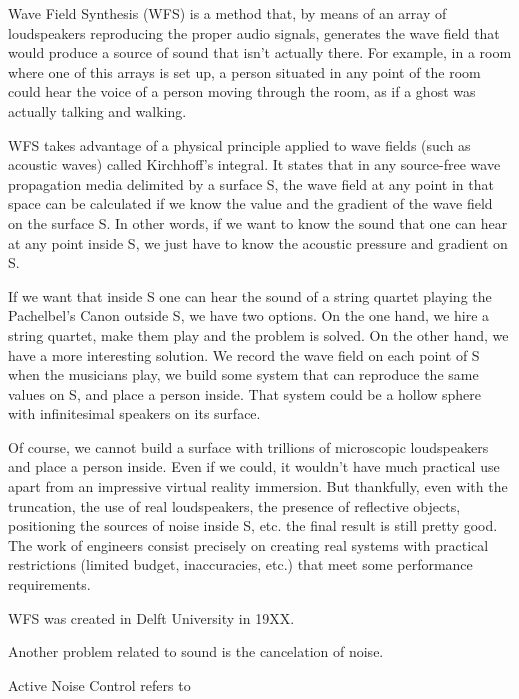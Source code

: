 Wave Field Synthesis (WFS) is a method that, by means of an array of loudspeakers reproducing the proper audio signals, generates the wave field that would produce a source of sound that isn't actually there. For example, in a room where one of this arrays is set up, a person situated in any point of the room could hear the voice of a person moving through the room, as if a ghost was actually talking and walking.

WFS takes advantage of a physical principle applied to wave fields (such as acoustic waves) called Kirchhoff's integral. It states that in any source-free wave propagation media delimited by a surface S, the wave field at any point in that space can be calculated if we know the value and the gradient of the wave field on the surface S. In other words, if we want to know the sound that one can hear at any point inside S, we just have to know the acoustic pressure and gradient on S.

If we want that inside S one can hear the sound of a string quartet playing the Pachelbel's Canon outside S, we have two options. On the one hand, we hire a string quartet, make them play and the problem is solved. On the other hand, we have a more interesting solution. We record the wave field on each point of S when the musicians play, we build some system that can reproduce the same values on S, and place a person inside. That system could be a hollow sphere with infinitesimal speakers on its surface.

Of course, we cannot build a surface with trillions of microscopic loudspeakers and place a person inside. Even if we could, it wouldn't have much practical use apart from an impressive virtual reality immersion. But thankfully, even with the truncation, the use of real loudspeakers, the presence of reflective objects, positioning the sources of noise inside S, etc. the final result is still pretty good. The work of engineers consist precisely on creating real systems with practical restrictions (limited budget, inaccuracies, etc.) that meet some performance requirements.

WFS was created in Delft University in 19XX.

Another problem related to sound is the cancelation of noise. 

Active Noise Control refers to 